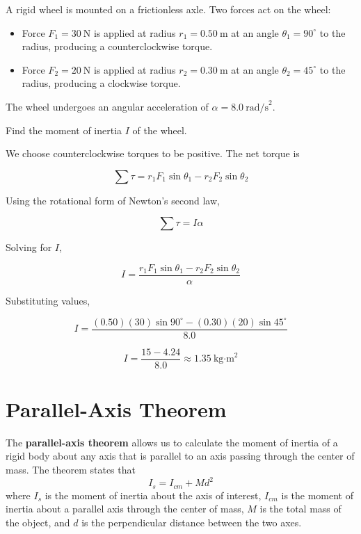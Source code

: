 \begin{Exercise}[title=Moment of Inertia from Multiple Torques,label=mominert1]
A rigid wheel is mounted on a frictionless axle. Two forces act on the wheel:

\begin{itemize}
\item Force $F_1 = 30\ \text{N}$ is applied at radius $r_1 = 0.50\ \text{m}$ at an angle $\theta_1 = 90^\circ$ to the radius, producing a counterclockwise torque.
\item Force $F_2 = 20\ \text{N}$ is applied at radius $r_2 = 0.30\ \text{m}$ at an angle $\theta_2 = 45^\circ$ to the radius, producing a clockwise torque.
\end{itemize}

The wheel undergoes an angular acceleration of $\alpha = 8.0\ \text{rad/s}^2$.

Find the moment of inertia $I$ of the wheel.
\end{Exercise}
\begin{Answer}[ref=mominert2]
We choose counterclockwise torques to be positive. The net torque is

\[
\sum \tau = r_1 F_1 \sin\theta_1 - r_2 F_2 \sin\theta_2
\]

Using the rotational form of Newton's second law,

\[
\sum \tau = I \alpha
\]

Solving for $I$,

\[
I = \frac{r_1 F_1 \sin\theta_1 - r_2 F_2 \sin\theta_2}{\alpha}
\]

Substituting values,

\[
I = \frac{(0.50)(30)\sin90^\circ - (0.30)(20)\sin45^\circ}{8.0}
\]

\[
I = \frac{15 - 4.24}{8.0} \approx 1.35\ \text{kg·m}^2
\]

\end{Answer}

\section{Parallel-Axis Theorem}

The \textbf{parallel-axis theorem} allows us to calculate the moment of inertia of a rigid body about any axis that is parallel to an axis passing through the center of mass. The theorem states that 
\begin{equation}
I_s = I_{cm} + Md^2
\end{equation}
where $I_s$ is the moment of inertia about the axis of interest, $I_{cm}$ is the moment of inertia about a parallel axis through the center of mass, $M$ is the total mass of the object, and $d$ is the perpendicular distance between the two axes.

